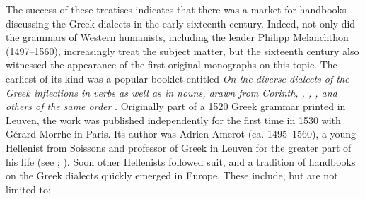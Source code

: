 The success of these treatises indicates that there was a market for handbooks discussing the Greek dialects in the early sixteenth century. Indeed, not only did the grammars of Western humanists, including the  leader Philipp Melanchthon (1497–1560), increasingly treat the subject matter, but the sixteenth century also witnessed the appearance of the first original monographs on this topic. The earliest of its kind was a popular booklet entitled \textit{On the diverse dialects of the Greek inflections in verbs as well as in nouns, drawn from Corinth, , , , and others of the same order} \citep{Amerot1530}. Originally part of a 1520 Greek grammar printed in Leuven, the work was published independently for the first time in 1530 with Gérard Morrhe in Paris. Its author was Adrien Amerot (ca. 1495–1560), a young Hellenist from Soissons and professor of Greek in Leuven for the greater part of his life (see \citealt{Hummel1999}; \citealt{VanRooyFcb}). Soon other Hellenists followed suit, and a tradition of  handbooks on the Greek dialects quickly emerged in Europe. These include, but are not limited to:

